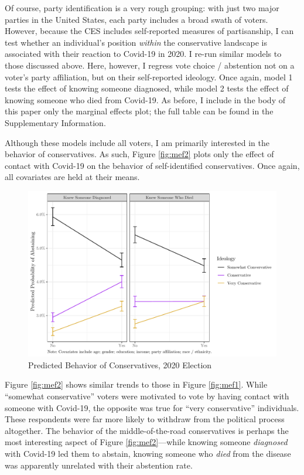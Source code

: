 \documentclass[
  12pt,
]{article}
\begin{document}
Of course, party identification is a very rough grouping: with just two major parties in the United States, each party includes a broad swath of voters. However, because the CES includes self-reported measures of partisanship, I can test whether an individual's position \emph{within} the conservative landscape is associated with their reaction to Covid-19 in 2020. I re-run similar models to those discussed above. Here, however, I regress vote choice / abstention not on a voter's party affiliation, but on their self-reported ideology. Once again, model 1 tests the effect of knowing someone diagnosed, while model 2 tests the effect of knowing someone who died from Covid-19. As before, I include in the body of this paper only the marginal effects plot; the full table can be found in the Supplementary Information.

Although these models include all voters, I am primarily interested in the behavior of conservatives. As such, Figure \ref{fig:mef2} plots only the effect of contact with Covid-19 on the behavior of self-identified conservatives. Once again, all covariates are held at their means.

\begin{figure}[H]

{\centering \includegraphics{theory_paper_files/figure-latex/mef2-c-1} 

}

\caption{\label{fig:mef2}Predicted Behavior of Conservatives, 2020 Election}\label{fig:mef2-c}
\end{figure}

Figure \ref{fig:mef2} shows similar trends to those in Figure \ref{fig:mef1}. While ``somewhat conservative'' voters were motivated to vote by having contact with someone with Covid-19, the opposite was true for ``very conservative'' individuals. These respondents were far more likely to withdraw from the political process altogether. The behavior of the middle-of-the-road conservatives is perhaps the most interesting aspect of Figure \ref{fig:mef2}---while knowing someone \emph{diagnosed} with Covid-19 led them to abstain, knowing someone who \emph{died} from the disease was apparently unrelated with their abstention rate.
\end{document}

